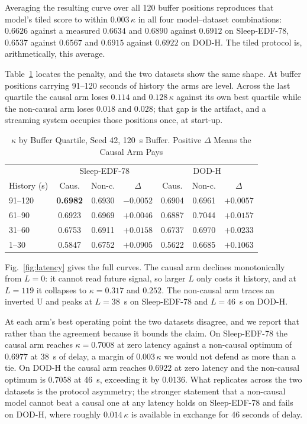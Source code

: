 \documentclass[conference]{IEEEtran}
\begin{document}
Averaging the resulting curve over all 120 buffer positions reproduces that model's tiled score to
within $0.003\,\kappa$ in all four model--dataset combinations: $0.6626$ against a measured
$0.6634$ and $0.6890$ against $0.6912$ on Sleep-EDF-78, $0.6537$ against $0.6567$ and $0.6915$
against $0.6922$ on DOD-H. The tiled protocol is, arithmetically, this average.

Table~\ref{tab:quartile} locates the penalty, and the two datasets show the same shape. At buffer
positions carrying 91--120 seconds of history the arms are level. Across the last quartile the
causal arm loses $0.114$ and $0.128\,\kappa$ against its own best quartile while the non-causal arm
loses $0.018$ and $0.028$; that gap is the artifact, and a streaming system occupies those
positions once, at start-up.

\begin{table}[t]
\caption{$\kappa$ by Buffer Quartile, Seed 42, 120~s Buffer. Positive $\Delta$ Means the Causal Arm
Pays}
\label{tab:quartile}
\centering
\footnotesize
\setlength{\tabcolsep}{3.6pt}
\begin{tabular}{lccc|ccc}
\toprule
 & \multicolumn{3}{c|}{Sleep-EDF-78} & \multicolumn{3}{c}{DOD-H} \\
History (s) & Caus. & Non-c. & $\Delta$ & Caus. & Non-c. & $\Delta$ \\
\midrule
91--120 & \textbf{0.6982} & 0.6930 & $-0.0052$ & 0.6904 & 0.6961 & $+0.0057$ \\
61--90  & 0.6923 & 0.6969 & $+0.0046$ & 0.6887 & 0.7044 & $+0.0157$ \\
31--60  & 0.6753 & 0.6911 & $+0.0158$ & 0.6737 & 0.6970 & $+0.0233$ \\
1--30   & 0.5847 & 0.6752 & $+0.0905$ & 0.5622 & 0.6685 & $+0.1063$ \\
\bottomrule
\end{tabular}
\end{table}

Fig.~\ref{fig:latency} gives the full curves. The causal arm declines monotonically from $L = 0$:
it cannot read future signal, so larger $L$ only costs it history, and at $L = 119$ it collapses to
$\kappa = 0.317$ and $0.252$. The non-causal arm traces an inverted U and peaks at $L = 38$~s on
Sleep-EDF-78 and $L = 46$~s on DOD-H.

At each arm's best operating point the two datasets disagree, and we report that rather than the
agreement because it bounds the claim. On Sleep-EDF-78 the causal arm reaches $\kappa = 0.7008$ at
zero latency against a non-causal optimum of $0.6977$ at 38~s of delay, a margin of
$0.003\,\kappa$ we would not defend as more than a tie. On DOD-H the causal arm reaches $0.6922$ at
zero latency and the non-causal optimum is $0.7058$ at 46~s, exceeding it by $0.0136$. What replicates
across the two datasets is the protocol asymmetry; the stronger statement that a non-causal model
cannot beat a causal one at any latency holds on Sleep-EDF-78 and fails on DOD-H, where roughly
$0.014\,\kappa$ is available in exchange for 46 seconds of delay.
\end{document}
